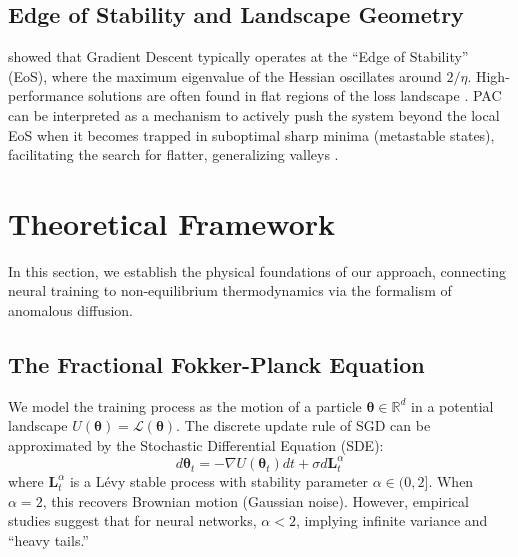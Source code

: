 \documentclass{article}
\theoremstyle{plain}
\theoremstyle{definition}
\theoremstyle{remark}
\newcommand{\Lloss}{\mathcal{L}}
\newcommand{\R}{\mathbb{R}}
\newcommand{\thetavec}{\boldsymbol{\theta}}
\begin{document}
\subsection{Edge of Stability and Landscape Geometry}
\citet{cohen2021edge} showed that Gradient Descent typically operates at the ``Edge of Stability'' (EoS), where the maximum eigenvalue of the Hessian oscillates around $2/\eta$. High-performance solutions are often found in flat regions of the loss landscape \cite{li2018visualizing, foret2020sharpness}. PAC can be interpreted as a mechanism to actively push the system beyond the local EoS when it becomes trapped in suboptimal sharp minima (metastable states), facilitating the search for flatter, generalizing valleys \cite{keskar2016large}.

\section{Theoretical Framework}
\label{sec:theory}

In this section, we establish the physical foundations of our approach, connecting neural training to non-equilibrium thermodynamics via the formalism of anomalous diffusion.

\subsection{The Fractional Fokker-Planck Equation}
We model the training process as the motion of a particle $\thetavec \in \R^d$ in a potential landscape $U(\thetavec) = \Lloss(\thetavec)$. The discrete update rule of SGD can be approximated by the Stochastic Differential Equation (SDE):
\begin{equation}
    d\thetavec_t = -\nabla U(\thetavec_t) dt + \sigma d\mathbf{L}_t^\alpha
    \label{eq:langevin}
\end{equation}
where $\mathbf{L}_t^\alpha$ is a Lévy stable process with stability parameter $\alpha \in (0, 2]$. When $\alpha=2$, this recovers Brownian motion (Gaussian noise). However, empirical studies \cite{simsekli2019tail} suggest that for neural networks, $\alpha < 2$, implying infinite variance and ``heavy tails.''
\end{document}

